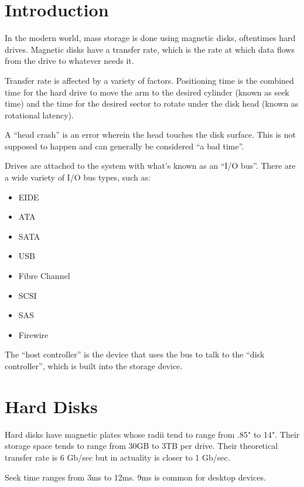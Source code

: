 \documentclass{article}
\begin{document}
\maketitle
\tableofcontents

\section{Introduction}
In the modern world, mass storage is done using magnetic disks, oftentimes
hard drives. Magnetic disks have a transfer rate, which is the rate at which
data flows from the drive to whatever needs it.

Transfer rate is affected by a variety of factors. Positioning time is the
combined time for the hard drive to move the arm to the desired cylinder
(known as seek time) and the time for the desired sector to rotate under the
disk head (known as rotational latency).

A ``head crash'' is an error wherein the head touches the disk surface. This
is not supposed to happen and can generally be considered ``a bad time''.

Drives are attached to the system with what's known as an ``I/O bus''. There
are a wide variety of I/O bus types, such as:

\begin{itemize}
	\item EIDE
	\item ATA
	\item SATA
	\item USB
	\item Fibre Channel
	\item SCSI
	\item SAS
	\item Firewire
\end{itemize}

The ``host controller'' is the device that uses the bus to talk to the ``disk
controller'', which is built into the storage device.

\section{Hard Disks}
Hard disks have magnetic plates whose radii tend to range from .85" to 14".
Their storage space tends to range from 30GB to 3TB per drive. Their
theoretical transfer rate is 6 Gb/sec but in actuality is closer to 1 Gb/sec.

Seek time ranges from 3ms to 12ms. 9ms is common for desktop devices.
\end{document}
